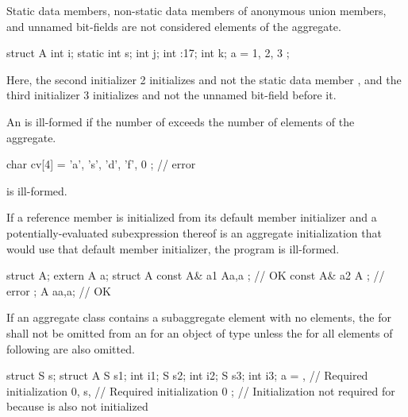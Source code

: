 \pnum
\begin{note}
Static data members,
non-static data members of anonymous union members,
and
unnamed bit-fields
are not considered elements of the aggregate.
\begin{example}

\begin{codeblock}
struct A {
  int i;
  static int s;
  int j;
  int :17;
  int k;
} a = { 1, 2, 3 };
\end{codeblock}

Here, the second initializer 2 initializes
and not the static data member
, and the third initializer 3 initializes 
and not the unnamed bit-field before it.
\end{example}
\end{note}

\pnum
An
is ill-formed if the number of
exceeds the number of elements of the aggregate.
\begin{example}

\begin{codeblock}
char cv[4] = { 'a', 's', 'd', 'f', 0 };     // error
\end{codeblock}

is ill-formed.
\end{example}

\pnum
If a reference member is initialized from its default member initializer
and a potentially-evaluated subexpression thereof is an aggregate
initialization that would use that default member initializer,
the program is ill-formed.
\begin{example}
\begin{codeblock}
  struct A;
  extern A a;
  struct A {
    const A& a1 { A{a,a} };     // OK
    const A& a2 { A{} };        // error
  };
  A a{a,a};                     // OK
\end{codeblock}
\end{example}

\pnum
If an aggregate class  contains a subaggregate element
 with no elements,
the  for  shall not be
omitted from an  for an object of type
 unless the  for all
elements of  following  are also omitted.
\begin{example}
\begin{codeblock}
struct S { } s;
struct A {
  S s1;
  int i1;
  S s2;
  int i2;
  S s3;
  int i3;
} a = {
  { },              // Required initialization
  0,
  s,                // Required initialization
  0
};                  // Initialization not required for  because  is also not initialized
\end{codeblock}
\end{example}

